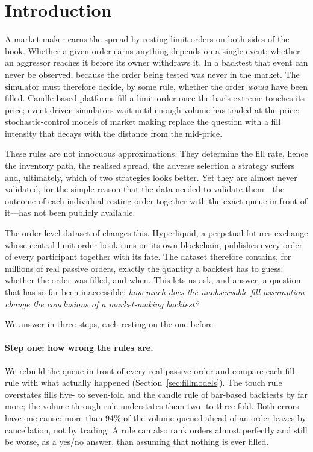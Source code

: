 \section{Introduction}
\label{sec:intro}

A market maker earns the spread by resting limit orders on both sides of the
book. Whether a given order earns anything depends on a single event: whether an
aggressor reaches it before its owner withdraws it. In a backtest that event can
never be observed, because the order being tested was never in the market. The
simulator must therefore decide, by some rule, whether the order \emph{would}
have been filled. Candle-based platforms fill a limit order once the bar's
extreme touches its price; event-driven simulators wait until enough volume has
traded at the price; stochastic-control models of market making replace the
question with a fill intensity that decays with the distance from the mid-price.

These rules are not innocuous approximations. They determine the fill rate,
hence the inventory path, the realised spread, the adverse selection a strategy
suffers and, ultimately, which of two strategies looks better. Yet they are
almost never validated, for the simple reason that the data needed to validate
them---the outcome of each individual resting order together with the exact
queue in front of it---has not been publicly available.

The order-level dataset of \citet{albers2026openbook} changes this. Hyperliquid,
a perpetual-futures exchange whose central limit order book runs on its own
blockchain, publishes every order of every participant together with its fate.
The dataset therefore contains, for millions of real passive orders, exactly the
quantity a backtest has to guess: whether the order was filled, and when. This
lets us ask, and answer, a question that has so far been inaccessible:
\emph{how much does the unobservable fill assumption change the conclusions of a
market-making backtest?}

We answer in three steps, each resting on the one before.

\paragraph{Step one: how wrong the rules are.}
We rebuild the queue in front of every real passive order and compare each fill
rule with what actually happened (Section~\ref{sec:fillmodels}). The touch rule
overstates fills five- to seven-fold and the candle rule of bar-based backtests
by far more; the volume-through rule understates them two- to three-fold. Both
errors have one cause: more than 94\% of the volume queued ahead of an order
leaves by cancellation, not by trading. A rule can also rank orders almost
perfectly and still be worse, as a yes/no answer, than assuming that nothing is
ever filled.

